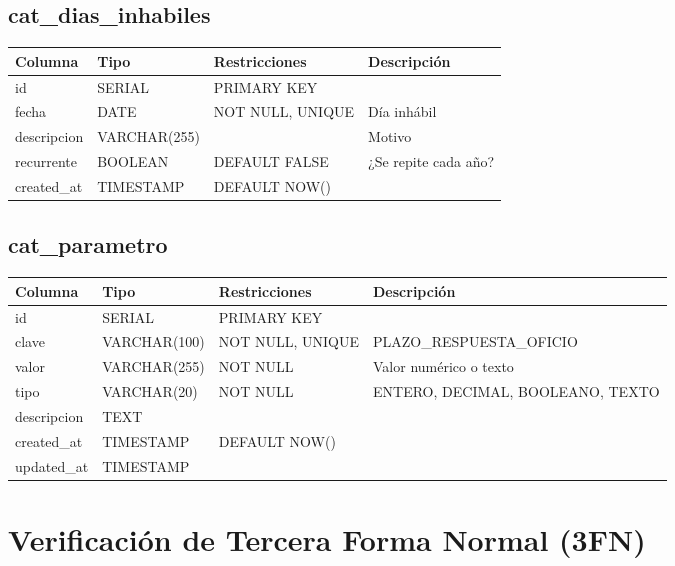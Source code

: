 \documentclass[12pt, a4paper]{article}
\begin{document}
\subsection{cat\_dias\_inhabiles}
\begin{longtable}{|p{3.5cm}|p{2.5cm}|p{3cm}|p{5cm}|}
    \hline
    \rowcolor[gray]{0.9}
    \textbf{Columna} & \textbf{Tipo} & \textbf{Restricciones} & \textbf{Descripción} \\
    \hline
    id & SERIAL & PRIMARY KEY & \\
    \hline
    fecha & DATE & NOT NULL, UNIQUE & Día inhábil \\
    \hline
    descripcion & VARCHAR(255) & & Motivo \\
    \hline
    recurrente & BOOLEAN & DEFAULT FALSE & ¿Se repite cada año? \\
    \hline
    created\_at & TIMESTAMP & DEFAULT NOW() & \\
    \hline
\end{longtable}

\subsection{cat\_parametro}
\begin{longtable}{|p{3.5cm}|p{2.5cm}|p{3cm}|p{5cm}|}
    \hline
    \rowcolor[gray]{0.9}
    \textbf{Columna} & \textbf{Tipo} & \textbf{Restricciones} & \textbf{Descripción} \\
    \hline
    id & SERIAL & PRIMARY KEY & \\
    \hline
    clave & VARCHAR(100) & NOT NULL, UNIQUE & PLAZO\_RESPUESTA\_OFICIO \\
    \hline
    valor & VARCHAR(255) & NOT NULL & Valor numérico o texto \\
    \hline
    tipo & VARCHAR(20) & NOT NULL & ENTERO, DECIMAL, BOOLEANO, TEXTO \\
    \hline
    descripcion & TEXT & & \\
    \hline
    created\_at & TIMESTAMP & DEFAULT NOW() & \\
    \hline
    updated\_at & TIMESTAMP & & \\
    \hline
\end{longtable}

\section{Verificación de Tercera Forma Normal (3FN)}
\label{sec:3fn}
\end{document}

